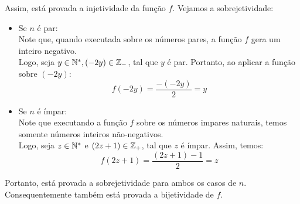 Assim, está provada a injetividade da função $f$. Vejamos a sobrejetividade:
\begin{itemize}
    \item Se $n$ é par: \\
    Note que, quando executada sobre os números pares, a função $f$ gera um inteiro negativo. \\
    Logo, seja $y \in \mathbb N^*, (-2y) \in \mathbb Z_-$, tal que $y$ é par. Portanto, ao aplicar a função sobre $(-2y)$:
    \begin{displaymath}
        f(-2y) = \frac{-(-2y)}{2} = y
    \end{displaymath}
    \item Se $n$ é ímpar: \\
    Note que executando a função $f$ sobre os números impares naturais, temos somente números inteiros não-negativos. \\
    Logo, seja $z \in \mathbb N^*$ e $(2z + 1) \in \mathbb Z_+$, tal que $z$ é ímpar. Assim, temos:
    \begin{displaymath}
        f(2z + 1) = \frac{(2z + 1) - 1}{2} = z
    \end{displaymath}
\end{itemize}
Portanto, está provada a sobrejetividade para ambos os casos de $n$. Consequentemente também está provada a bijetividade de $f$.